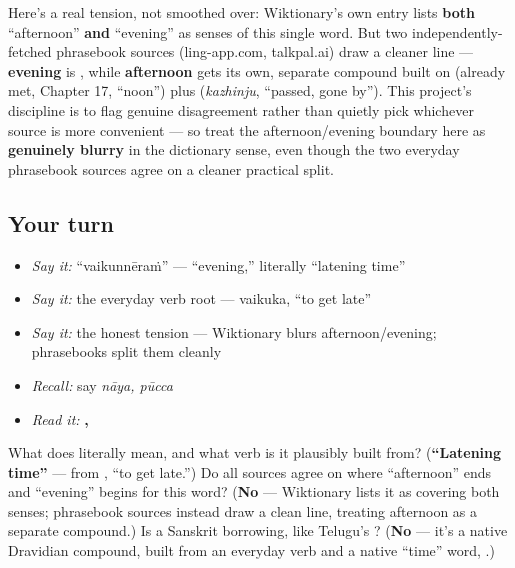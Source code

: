 \begin{culture}
Here's a real tension, not smoothed over: Wiktionary's own entry lists \textbf{both} \textquotedblleft{}afternoon\textquotedblright{} \textbf{and} \textquotedblleft{}evening\textquotedblright{} as senses of this single word. But two independently-fetched phrasebook sources (ling-app.com, talkpal.ai) draw a cleaner line — \textbf{evening} is \textbf{}, while \textbf{afternoon} gets its own, separate compound built on \textbf{} (already met, Chapter 17, \textquotedblleft{}noon\textquotedblright{}) plus \textbf{} (\emph{kazhinju}, \textquotedblleft{}passed, gone by\textquotedblright{}). This project's discipline is to flag genuine disagreement rather than quietly pick whichever source is more convenient — so treat the afternoon/evening boundary here as \textbf{genuinely blurry} in the dictionary sense, even though the two everyday phrasebook sources agree on a cleaner practical split.
\end{culture}

\subsection*{Your turn}
\begin{itemize}
\raggedright
  \item \emph{Say it:} \textquotedblleft{}vaikunnēraṁ\textquotedblright{} — \textquotedblleft{}evening,\textquotedblright{} literally \textquotedblleft{}latening time\textquotedblright{}
  \item \emph{Say it:} the everyday verb root — vaikuka, \textquotedblleft{}to get late\textquotedblright{}
  \item \emph{Say it:} the honest tension — Wiktionary blurs afternoon/evening; phrasebooks split them cleanly
  \item \emph{Recall:} say \emph{nāya, pūcca}
  \item \emph{Read it:} \textbf{, }
\end{itemize}

\begin{tcolorbox}[breakable,colback=teal!4,colframe=teal!35!black,title={Before you move on}]
What does  literally mean, and what verb is it plausibly built from? (\textbf{\textquotedblleft{}Latening time\textquotedblright{}} — from \textbf{}, \textquotedblleft{}to get late.\textquotedblright{}) Do all sources agree on where \textquotedblleft{}afternoon\textquotedblright{} ends and \textquotedblleft{}evening\textquotedblright{} begins for this word? (\textbf{No} — Wiktionary lists it as covering both senses; phrasebook sources instead draw a clean line, treating afternoon as a separate compound.) Is  a Sanskrit borrowing, like Telugu's ? (\textbf{No} — it's a native Dravidian compound, built from an everyday verb and a native \textquotedblleft{}time\textquotedblright{} word, .)
\end{tcolorbox}

